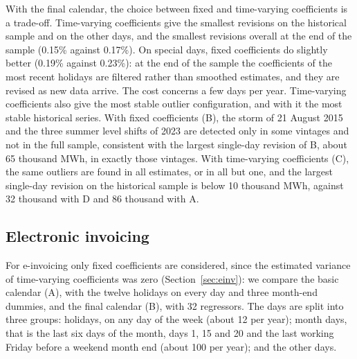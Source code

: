 \documentclass[Afour, times]{sagej}
\begin{document}
With the final calendar, the choice between fixed and time-varying coefficients is a trade-off. Time-varying coefficients give the smallest revisions on the historical sample and on the other days, and the smallest revisions overall at the end of the sample (0.15\% against 0.17\%). On special days, fixed coefficients do slightly better (0.19\% against 0.23\%): at the end of the sample the coefficients of the most recent holidays are filtered rather than smoothed estimates, and they are revised as new data arrive. The cost concerns a few days per year. Time-varying coefficients also give the most stable outlier configuration, and with it the most stable historical series. With fixed coefficients (B), the storm of 21 August 2015 and the three summer level shifts of 2023 are detected only in some vintages and not in the full sample, consistent with the largest single-day revision of B, about 65 thousand MWh, in exactly those vintages. With time-varying coefficients (C), the same outliers are found in all estimates, or in all but one, and the largest single-day revision on the historical sample is below 10 thousand MWh, against 32 thousand with D and 86 thousand with A.

\subsection{Electronic invoicing}
\label{subsec:rev_einv}

For e-invoicing only fixed coefficients are considered, since the estimated variance of time-varying coefficients was zero (Section~\ref{sec:einv}): we compare the basic calendar (A), with the twelve holidays on every day and three month-end dummies, and the final calendar (B), with 32 regressors. The days are split into three groups: holidays, on any day of the week (about 12 per year); month days, that is the last six days of the month, days 1, 15 and 20 and the last working Friday before a weekend month end (about 100 per year); and the other days.
\end{document}
